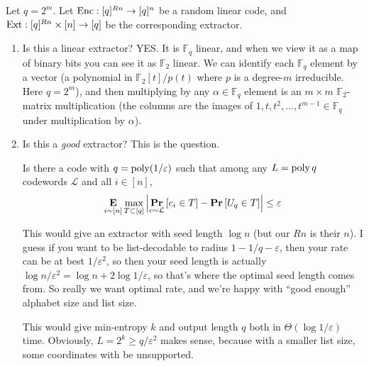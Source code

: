 \begin{question}
  Let $q=2^m$.
  Let $\operatorname*{Enc}:[q]^{Rn}\to[q]^n$ be a random linear code, and $\textnormal{Ext}:[q]^{Rn}\times [n]\to [q]$ be the corresponding extractor.
\begin{enumerate}
  \item Is this a linear extractor? YES. It is $\mathbb{F}_q$ linear, and when we view it as a map of binary bits you can see it as $\mathbb{F}_2$ linear. We can identify each $\mathbb{F}_q$ element by a vector (a polynomial in $\mathbb{F}_2[t]/p(t)$ where $p$ is a degree-$m$ irreducible. Here $q=2^m$), and then multiplying by any $\alpha\in\mathbb{F}_q$ element is an $m\times m$ $\mathbb{F}_2$-matrix multiplication (the columns are the images of $1,t,t^2,\dots,t^{m-1}\in\mathbb{F}_q$ under multiplication by $\alpha$).

  \item Is this a \emph{good} extractor? This is the question.

    Is there a code with $q=\operatorname*{poly}(1/\varepsilon)$ such that among any $L=\operatorname*{poly} q$ codewords $\mathcal{L}$ and all $i\in[n]$,
    \begin{align}
      \mathop{\bf E\/}_{i\sim [n]}\max_{T\subset[q]}\left\vert\mathop{\bf Pr\/}_{c\sim \mathcal{L}}\left[ c_i\in T \right] - \mathop{\bf Pr\/}\left[ U_q\in T \right] \right\vert\le \varepsilon
      \label{}
    \end{align}

    This would give an extractor with seed length $\log n$ (but our $Rn$ is their $n$).
    I guess if you want to be list-decodable to radius $1-1/q-\varepsilon$, then your rate can be at best $1/\varepsilon^2$, so then your seed length is actually $\log n/\varepsilon^2 = \log n +2\log 1/\varepsilon$, so that's where the optimal seed length comes from. So really we want optimal rate, and we're happy with ``good enough'' alphabet size and list size.

    This would give min-entropy $k$ and output length $q$ both in $\Theta(\log 1/\varepsilon)$ time.
    Obviously, $L=2^k\ge q/\varepsilon^2$ makes sense, because with a smaller list size, some coordinates with be unsupported.


\end{enumerate}
\end{question}
